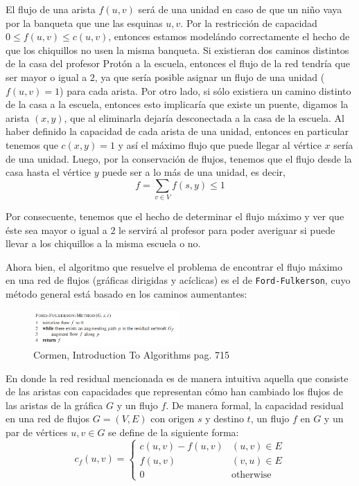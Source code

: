 \documentclass[letterpaper,11pt]{article}
\begin{document}
\begin{enumerate}
    El flujo de una arista $f(u,v)$ será de una unidad en caso de que un niño
    vaya por la banqueta que une las esquinas $u, v$. Por la restricción de 
    capacidad $0 \leq f(u,v) \leq c(u,v)$, entonces estamos modelándo 
    correctamente el hecho de que los chiquillos no usen la misma banqueta. 
    Si existieran dos caminos distintos de la casa del profesor Protón a la 
    escuela, entonces el flujo de la red tendría que ser mayor o igual a $2$, ya 
    que sería posible asignar un flujo de una unidad ($f(u,v) = 1$) para cada 
    arista. Por otro lado, si sólo existiera un camino distinto de la casa a 
    la escuela, entonces esto implicaría que existe un puente, digamos la arista
    $(x,y)$, que al eliminarla dejaría desconectada a la casa de la escuela. 
    Al haber definido la capacidad de cada arista de una unidad, entonces en 
    particular tenemos que $c(x,y) = 1$ y así el máximo flujo que puede llegar
    al vértice $x$ sería de una unidad. Luego, por la conservación de flujos, 
    tenemos que el flujo desde la casa hasta el vértice $y$ puede ser a lo más 
    de una unidad, es decir, 
    \begin{equation*}
        f = \sum_{v \in V} f(s, y) \leq 1
    \end{equation*}

    Por consecuente, tenemos que el hecho de determinar el flujo máximo y ver 
    que éste sea mayor o igual a $2$ le servirá al profesor para poder 
    averiguar si puede llevar a los chiquillos a la misma escuela o no.

    Ahora bien, el algoritmo que resuelve el problema de encontrar el flujo 
    máximo en una red de flujos (gráficas dirigidas y acíclicas) es el de 
    \texttt{Ford-Fulkerson}, cuyo método general está basado en los caminos 
    aumentantes:
    \begin{figure}[H]
        \centering
        \includegraphics[width=0.5\textwidth]{imagenes/FORD.png}
        \caption{Cormen, Introduction To Algorithms pag. 715}
    \end{figure}

    En donde la red residual mencionada es de manera intuitiva aquella que 
    consiste de las aristas con capacidades que representan cómo han 
    cambiado los flujos de las aristas de la gráfica $G$ y un flujo $f$. 
    De manera formal, la capacidad residual en una red de flujos $G = (V, E)$
    con origen $s$ y destino $t$, un flujo $f$ en $G$ y un par de vértices 
    $u,v \in G$ se define de la siguiente forma:
    \begin{equation*}
        c_f(u,v) = 
        \begin{cases}
            c(u,v) - f(u,v) & (u,v) \in E \\ 
            f(u,v) & (v,u) \in E \\ 
            0 & \text{otherwise}
        \end{cases}
    \end{equation*}


\end{enumerate}
\end{document}
